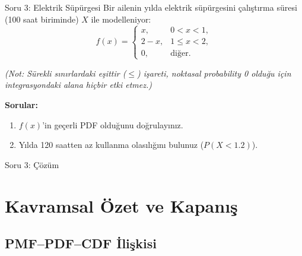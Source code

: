\documentclass[light]{lutbeamer}
\begin{document}
\begin{frame}{Soru 3: Elektrik Süpürgesi}
    Bir ailenin yılda elektrik süpürgesini çalıştırma süresi (100 saat biriminde) $X$ ile modelleniyor:
    \[
    f(x) =
    \begin{cases}
      x, & 0 < x < 1,\\
      2 - x, & 1 \le x < 2,\\
      0, & \text{diğer}.
    \end{cases}
    \]
    \begin{center}
      \scriptsize \textit{(Not: Sürekli sınırlardaki eşittir ($\le$) işareti, noktasal probability 0 olduğu için integrasyondaki alana hiçbir etki etmez.)}
    \end{center}

    \textbf{Sorular:}
    \begin{enumerate}
      \item[(a)] $f(x)$'in geçerli PDF olduğunu doğrulayınız.
      \item[(b)] Yılda 120 saatten az kullanma olasılığını bulunuz ($P(X < 1.2)$).
    \end{enumerate}
\end{frame}

\begin{frame}{Soru 3: Çözüm}
\end{frame}



\section{Kavramsal Özet ve Kapanış}
\subsection{PMF--PDF--CDF İlişkisi}
\end{document}
